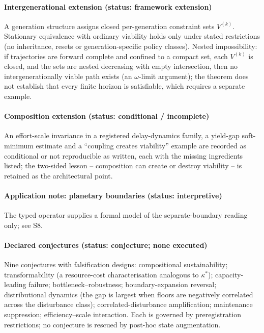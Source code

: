 \paragraph{Intergenerational extension (status: framework extension)} A generation structure assigns closed per-generation constraint sets $V^{(k)}$. Stationary equivalence with ordinary viability holds only under stated restrictions (no inheritance, resets or generation-specific policy classes). Nested impossibility: if trajectories are forward complete and confined to a compact set, each $V^{(k)}$ is closed, and the sets are nested decreasing with empty intersection, then no intergenerationally viable path exists (an $\omega$-limit argument); the theorem does not establish that every finite horizon is satisfiable, which requires a separate example.

\paragraph{Composition extension (status: conditional / incomplete)} An effort-scale invariance in a registered delay-dynamics family, a yield-gap soft-minimum estimate and a ``coupling creates viability'' example are recorded as conditional or not reproducible as written, each with the missing ingredients listed; the two-sided lesson -- composition can create or destroy viability -- is retained as the architectural point.

\paragraph{Application note: planetary boundaries (status: interpretive)} The typed operator supplies a formal model of the separate-boundary reading only; see S8.

\paragraph{Declared conjectures (status: conjecture; none executed)} Nine conjectures with falsification designs: compositional sustainability; transformability (a resource-cost characterisation analogous to $\kappa^*$); capacity-leading failure; bottleneck--robustness; boundary-expansion reversal; distributional dynamics (the gap is largest when floors are negatively correlated across the disturbance class); correlated-disturbance amplification; maintenance suppression; efficiency--scale interaction. Each is governed by preregistration restrictions; no conjecture is rescued by post-hoc state augmentation.

